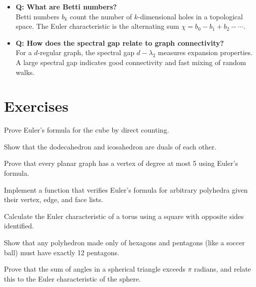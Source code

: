 \begin{itemize}
\item \textbf{Q: What are Betti numbers?} \\
Betti numbers $b_k$ count the number of $k$-dimensional holes in a topological space. The Euler characteristic is the alternating sum $\chi = b_0 - b_1 + b_2 - \cdots$.

\item \textbf{Q: How does the spectral gap relate to graph connectivity?} \\
For a $d$-regular graph, the spectral gap $d - \lambda_2$ measures expansion properties. A large spectral gap indicates good connectivity and fast mixing of random walks.
\end{itemize}

\section{Exercises}

\begin{exercise}
Prove Euler's formula for the cube by direct counting.
\end{exercise}

\begin{exercise}
Show that the dodecahedron and icosahedron are duals of each other.
\end{exercise}

\begin{exercise}
Prove that every planar graph has a vertex of degree at most 5 using Euler's formula.
\end{exercise}

\begin{exercise}[Computational]
Implement a function that verifies Euler's formula for arbitrary polyhedra given their vertex, edge, and face lists.
\end{exercise}

\begin{exercise}
Calculate the Euler characteristic of a torus using a square with opposite sides identified.
\end{exercise}

\begin{exercise}
Show that any polyhedron made only of hexagons and pentagons (like a soccer ball) must have exactly 12 pentagons.
\end{exercise}

\begin{exercise}
Prove that the sum of angles in a spherical triangle exceeds $\pi$ radians, and relate this to the Euler characteristic of the sphere.
\end{exercise}

